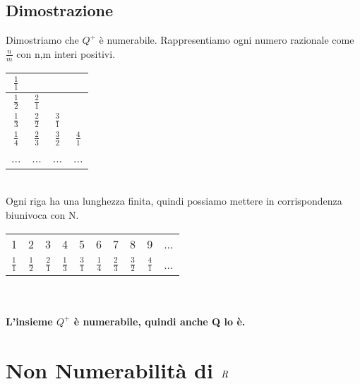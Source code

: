 \documentclass[11pt, a4paper]{book}
\begin{document}
\subsection*{Dimostrazione}
Dimostriamo che $ Q^+$ è numerabile. Rappresentiamo ogni numero razionale come $\frac{n}{m}$ con n,m interi positivi.\	
\\
\begin{tabular}{|c|c|c|c|}
\hline
\rule [-0,3cm]{0mm}{0,7cm}
$\frac{1}{1}$ & & & \\
\hline
\rule [-0,3cm]{0mm}{0,7cm}
$\frac{1}{2}$ & $\frac{2}{1}$ & &\\
\hline
\rule [-0,3cm]{0mm}{0,7cm}
$\frac{1}{3}$ & $\frac{2}{2}$ & $\frac{3}{1}$ &\\
\hline
\rule [-0,3cm]{0mm}{0,7cm}
$\frac{1}{4}$ & $\frac{2}{3}$ & $\frac{3}{2}$ & $\frac{4}{1}$\\
\hline
... & ... & ... & ...\\
\hline
\end{tabular}
\\
Ogni riga ha una lunghezza finita, quindi possiamo mettere in corrispondenza biunivoca con N.
\\
\begin{tabular}{lcrlcrlcrl}
1 & 2 & 3 & 4 & 5 & 6 & 7 & 8 & 9 & ...\\
$\frac{1}{1}$ & $\frac{1}{2}$ & $\frac{2}{1}$ & $\frac{1}{3}$ & $\frac{3}{1}$ & $\frac{1}{4}$ & $\frac{2}{3}$ & $\frac{3}{2}$ & $\frac{4}{1}$ & ...
\end{tabular}
\\
\\
\textbf{L'insieme $Q^+$ è numerabile, quindi anche Q lo è.}

\section{Non Numerabilità di $\emph{R}$}
\end{document}
